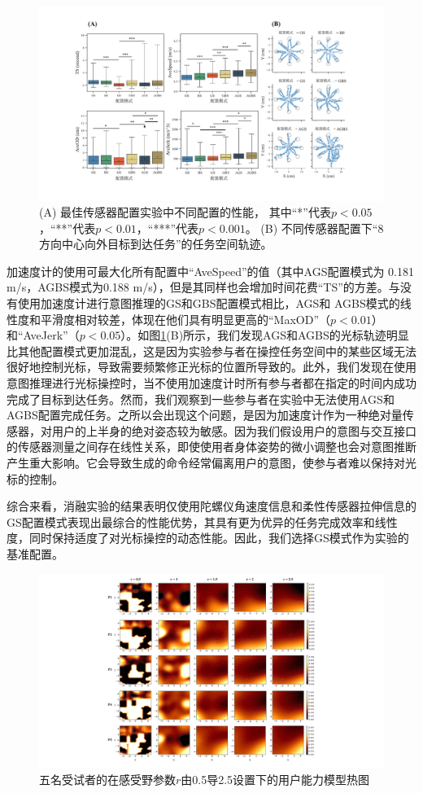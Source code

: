 \begin{figure}[!t]
    \includegraphics[width=1\textwidth]{figures/3-Fig-10.pdf}
    \caption{(A) 最佳传感器配置实验中不同配置的性能， 其中``*''代表$p<0.05$，``**''代表$p<0.01$，``***''代表$p<0.001$。 (B) 不同传感器配置下``8 方向中心向外目标到达任务''的任务空间轨迹。}
    \label{fig:3-10}
\end{figure}  
加速度计的使用可最大化所有配置中``AveSpeed''的值（其中AGS配置模式为 0.181 m/s，AGBS模式为0.188 m/s），但是其同样也会增加时间花费``TS''的方差。与没有使用加速度计进行意图推理的GS和GBS配置模式相比，AGS和 AGBS模式的线性度和平滑度相对较差，体现在他们具有明显更高的``MaxOD''（$p<0.01$）和``AveJerk''（$p<0.05$）。如图\ref{fig:3-10}(B)所示，我们发现AGS和AGBS的光标轨迹明显比其他配置模式更加混乱，这是因为实验参与者在操控任务空间中的某些区域无法很好地控制光标，导致需要频繁修正光标的位置所导致的。此外，我们发现在使用意图推理进行光标操控时，当不使用加速度计时所有参与者都在指定的时间内成功完成了目标到达任务。然而，我们观察到一些参与者在实验中无法使用AGS和AGBS配置完成任务。之所以会出现这个问题，是因为加速度计作为一种绝对量传感器，对用户的上半身的绝对姿态较为敏感。因为我们假设用户的意图与交互接口的传感器测量之间存在线性关系，即使使用者身体姿势的微小调整也会对意图推断产生重大影响。它会导致生成的命令经常偏离用户的意图，使参与者难以保持对光标的控制。  

综合来看，消融实验的结果表明仅使用陀螺仪角速度信息和柔性传感器拉伸信息的GS配置模式表现出最综合的性能优势，其具有更为优异的任务完成效率和线性度，同时保持适度了对光标操控的动态性能。因此，我们选择GS模式作为实验的基准配置。
\begin{figure}[!t]
    \includegraphics[width=1\textwidth]{figures/3-Fig-11.pdf}
    \caption{五名受试者的在感受野参数$r$由0.5导2.5设置下的用户能力模型热图}
    \label{fig:3-11}
\end{figure}  
